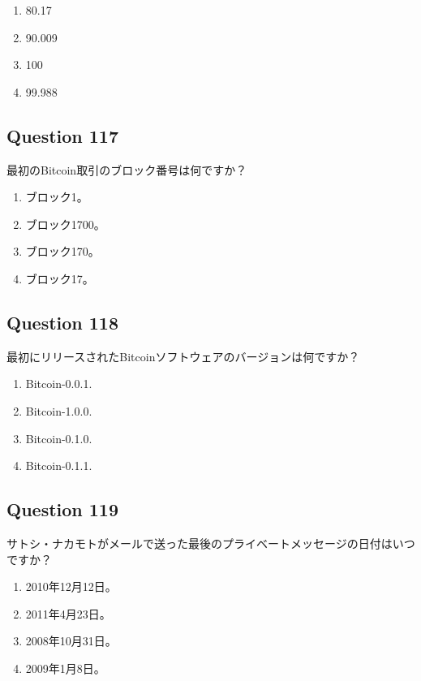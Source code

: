 \documentclass[12pt,a4paper]{article}
\begin{document}
\begin{enumerate}[label=\Alph*., leftmargin=*]
\item 80.17%
\item 90.009%
\item 100%
\item 99.988%
\end{enumerate}

\bigskip


\subsection*{Question 117}
最初のBitcoin取引のブロック番号は何ですか？

\begin{enumerate}[label=\Alph*., leftmargin=*]
\item ブロック1。
\item ブロック1700。
\item ブロック170。
\item ブロック17。
\end{enumerate}

\bigskip


\subsection*{Question 118}
最初にリリースされたBitcoinソフトウェアのバージョンは何ですか？

\begin{enumerate}[label=\Alph*., leftmargin=*]
\item Bitcoin-0.0.1.
\item Bitcoin-1.0.0.
\item Bitcoin-0.1.0.
\item Bitcoin-0.1.1.
\end{enumerate}

\bigskip


\subsection*{Question 119}
サトシ・ナカモトがメールで送った最後のプライベートメッセージの日付はいつですか？

\begin{enumerate}[label=\Alph*., leftmargin=*]
\item 2010年12月12日。
\item 2011年4月23日。
\item 2008年10月31日。
\item 2009年1月8日。
\end{enumerate}
\end{document}
